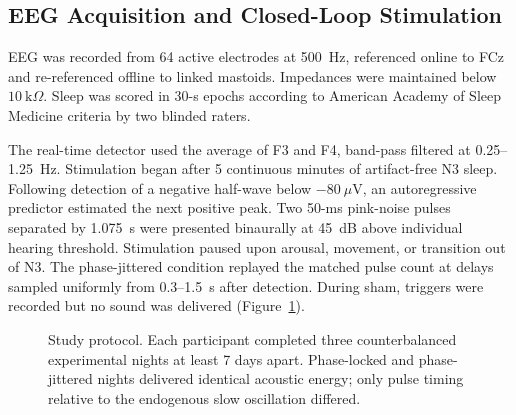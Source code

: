 \subsection{EEG Acquisition and Closed-Loop Stimulation}

EEG was recorded from 64 active electrodes at 500~Hz, referenced online to FCz and re-referenced offline to linked mastoids. Impedances were maintained below $10~\mathrm{k}\Omega$. Sleep was scored in 30-s epochs according to American Academy of Sleep Medicine criteria by two blinded raters.

The real-time detector used the average of F3 and F4, band-pass filtered at 0.25--1.25~Hz. Stimulation began after 5 continuous minutes of artifact-free N3 sleep. Following detection of a negative half-wave below $-80~\mu$V, an autoregressive predictor estimated the next positive peak. Two 50-ms pink-noise pulses separated by 1.075~s were presented binaurally at 45~dB above individual hearing threshold. Stimulation paused upon arousal, movement, or transition out of N3. The phase-jittered condition replayed the matched pulse count at delays sampled uniformly from 0.3--1.5~s after detection. During sham, triggers were recorded but no sound was delivered (Figure~\ref{fig:protocol}).

\begin{figure}[htbp]
\centering
{}
\caption{Study protocol. Each participant completed three counterbalanced experimental nights at least 7 days apart. Phase-locked and phase-jittered nights delivered identical acoustic energy; only pulse timing relative to the endogenous slow oscillation differed.}
\label{fig:protocol}
\end{figure}

